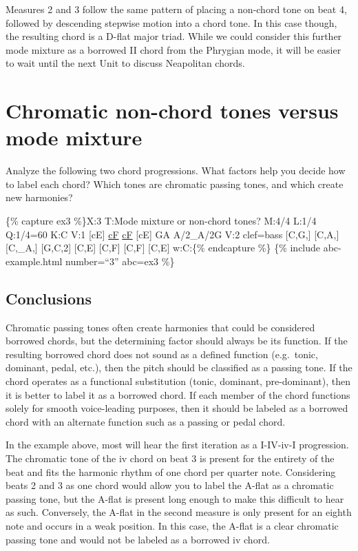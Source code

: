 \documentclass{book}
\begin{document}
Measures 2 and 3 follow the same pattern of placing a non-chord tone on beat
4, followed by descending stepwise motion into a chord tone. In this case
though, the resulting chord is a D-flat major triad. While we could consider
this further mode mixture as a borrowed II chord from the Phrygian mode, it
will be easier to wait until the next Unit to discuss Neapolitan chords.

\hypertarget{chromatic-non-chord-tones-versus-mode-mixture}{%
\section{Chromatic non-chord tones versus mode
mixture}\label{chromatic-non-chord-tones-versus-mode-mixture}}

Analyze the following two chord progressions. What factors help you decide how
to label each chord? Which tones are chromatic passing tones, and which create
new harmonies?

\{\% capture ex3 \%\}X:3 T:Mode mixture or non-chord tones? M:4/4 L:1/4
Q:1/4=60 K:C V:1 {[}cE{]} \href{cantusFirmus.html}{cF}
\href{cantusFirmus.html}{cF} {[}cE{]}\textbar\textbar{} GA
A/2\_A/2G\textbar{]} V:2 clef=bass {[}C,G,{]} {[}C,A,{]} {[}C,\_A,{]}
{[}G,C,2{]}\textbar\textbar{} {[}C,E{]} {[}C,F{]} {[}C,F{]}
{[}C,E{]}\textbar{]} w:C:\{\% endcapture \%\} \{\% include abc-example.html
number=``3'' abc=ex3 \%\}

\hypertarget{conclusions-52}{%
\subsection{Conclusions}\label{conclusions-52}}

Chromatic passing tones often create harmonies that could be considered
borrowed chords, but the determining factor should always be its function. If
the resulting borrowed chord does not sound as a defined function (e.g.~tonic,
dominant, pedal, etc.), then the pitch should be classified as a passing tone.
If the chord operates as a functional substitution (tonic, dominant,
pre-dominant), then it is better to label it as a borrowed chord. If each
member of the chord functions solely for smooth voice-leading purposes, then
it should be labeled as a borrowed chord with an alternate function such as a
passing or pedal chord.

In the example above, most will hear the first iteration as a I-IV-iv-I
progression. The chromatic tone of the iv chord on beat 3 is present for the
entirety of the beat and fits the harmonic rhythm of one chord per quarter
note. Considering beats 2 and 3 as one chord would allow you to label the
A-flat as a chromatic passing tone, but the A-flat is present long enough to
make this difficult to hear as such. Conversely, the A-flat in the second
measure is only present for an eighth note and occurs in a weak position. In
this case, the A-flat is a clear chromatic passing tone and would not be
labeled as a borrowed iv chord.
\end{document}
